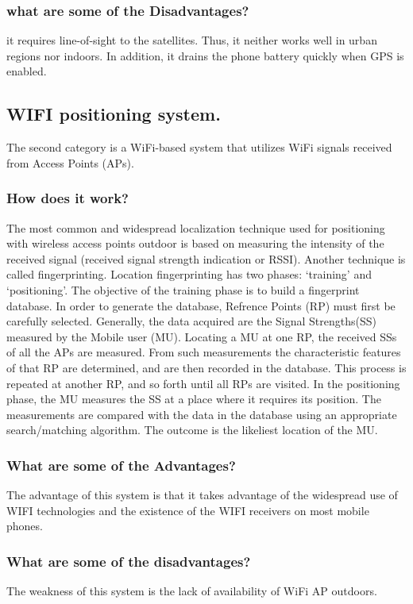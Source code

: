 \subsubsection{what are some of the Disadvantages?}
it requires line-of-sight to the satellites. Thus, it neither works well in urban
regions nor indoors. In addition, it drains the phone battery
quickly when GPS is enabled.\cite{8886005}
\subsection{WIFI positioning system.}
The second category is a WiFi-based system that utilizes WiFi signals received from Access Points (APs).
\subsubsection{How does it work?}
The most common and widespread localization technique used for positioning with wireless access points  outdoor is based on measuring the intensity of the received signal (received signal strength indication or RSSI).
Another technique is called fingerprinting. Location fingerprinting has two phases: ‘training’ and ‘positioning’. The objective of the training phase is to build a fingerprint database. In order to generate the database, Refrence Points (RP) must first be carefully selected. Generally, the data acquired are the Signal Strengths(SS) measured by the Mobile user (MU). Locating a MU at one RP, the received SSs of all the APs are measured. From such measurements the characteristic features of that RP are determined, and are then recorded in the database. This process is repeated at another RP, and so forth until all RPs are visited. In the positioning phase, the MU measures the SS at a place where it requires its position. The measurements are compared with the data in the database using an appropriate search/matching algorithm. The outcome is the likeliest location of the MU.\cite{wifi}
\subsubsection{What are some of the Advantages?}
The advantage of this system is that it takes advantage of the widespread use of WIFI technologies and the existence of the WIFI receivers on most mobile phones.
\subsubsection{What are some of the disadvantages?}
The weakness of this system is the lack of availability of WiFi AP outdoors.
